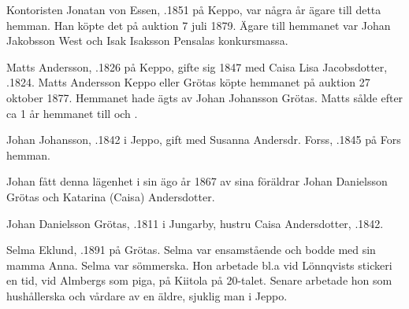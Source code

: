 Kontoristen Jonatan von Essen, .1851 på Keppo, var några år ägare till detta hemman. Han köpte det på auktion 7 juli 1879. Ägare till hemmanet var Johan Jakobsson West och Isak Isaksson Pensalas konkursmassa.


Matts Andersson, .1826 på Keppo, gifte sig 1847 med Caisa Lisa Jacobsdotter, .1824. Matts Andersson Keppo eller Grötas köpte hemmanet på auktion 27 oktober 1877. Hemmanet hade ägts av Johan Johansson Grötas. Matts sålde efter ca 1 år hemmanet till  och .


Johan Johansson, .1842 i Jeppo, gift med Susanna Andersdr. Forss, .1845 på Fors hemman.
\begin{jhchildren}
  \item {}
  \item {}
  \item {}
  \item {}
  \item {}
  \item {}
\end{jhchildren}

Johan fått denna lägenhet i sin ägo år 1867 av sina föräldrar Johan	Danielsson Grötas och Katarina (Caisa) Andersdotter.


Johan Danielsson Grötas, .1811 i Jungarby, hustru Caisa Andersdotter, .1842.





Selma Eklund, .1891 på Grötas. Selma var ensamstående och bodde med sin mamma Anna. Selma var sömmerska. Hon arbetade bl.a vid Lönnqvists stickeri en tid, vid Almbergs som piga, på Kiitola på 20-talet. Senare arbetade hon som hushållerska och vårdare av en äldre, sjuklig man i Jeppo.

